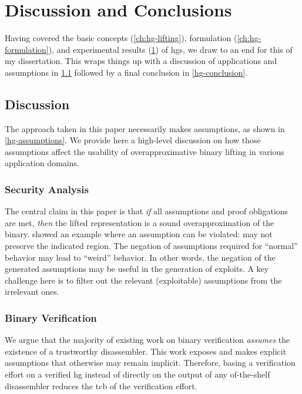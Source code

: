 \chapter{Discussion and Conclusions}\label{ch:hg-discussion}
Having covered the basic concepts (\cref{ch:hg-lifting}), formulation (\cref{ch:hg-formulation}), and experimental results (\cref{ch:hg-discussion}) of \acp{hg}, we draw to an end for this   of my dissertation.
This  wraps things up with a discussion of applications and assumptions in \cref{hg-discussion} followed by a final conclusion in \cref{hg-conclusion}.

\section{Discussion}\label{hg-discussion}
The approach taken in this paper necessarily makes assumptions, as shown in \cref{hg-assumptions}.
We provide here a high-level discussion on how those assumptions affect the usability of overapproximative binary lifting in various application domains.

\subsection{Security Analysis}
The central claim in this paper is that \emph{if} all assumptions and proof obligations are met,
\emph{then} the lifted representation is a sound overapproximation of the binary.
 showed an example where an assumption can be violated:  may not preserve the indicated region.
The negation of assumptions required for ``normal'' behavior may lead to ``weird'' behavior.
In other words, the negation of the generated assumptions may be useful in the generation of exploits.
A key challenge here is to filter out the relevant (exploitable) assumptions from the irrelevant ones.

\subsection{Binary Verification}
We argue that the majority of existing work on binary verification \emph{assumes} the existence of a trustworthy disassembler.
This work exposes and makes explicit assumptions that otherwise may remain implicit.
Therefore, basing a verification effort on a verified \ac{hg} instead of directly on the output of any of-the-shelf disassembler reduces the \ac{tcb} of the verification effort.


